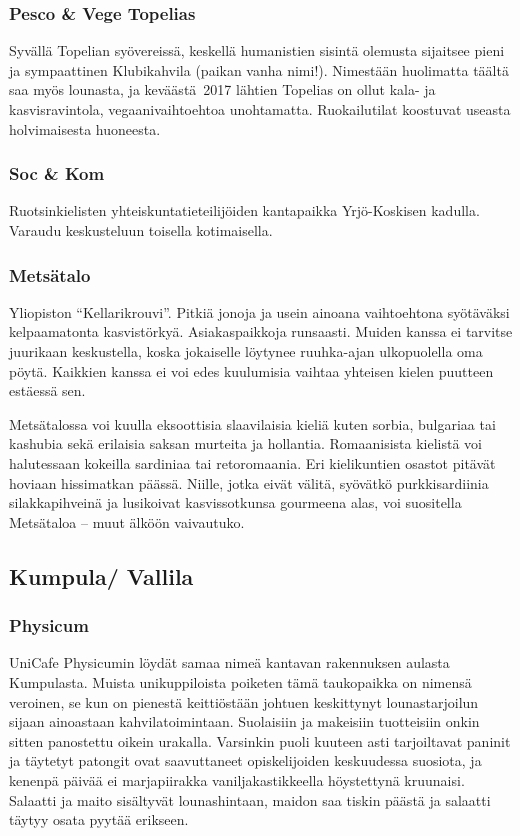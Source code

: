 \documentclass[../ala_hataile.tex]{subfiles}
\begin{document}
\subsubsection*{Pesco \& Vege Topelias}
Syvällä Topelian syövereissä, keskellä
humanistien sisintä olemusta sijaitsee pieni
ja sympaattinen Klubikahvila (paikan vanha
nimi!). Nimestään huolimatta täältä saa
myös lounasta, ja keväästä~2017 lähtien Topelias on ollut kala- ja kasvisravintola, vegaani\-vaihto\-ehtoa unohtamatta. Ruokailutilat
koostuvat useasta holvimaisesta huoneesta.
\subsubsection*{Soc \& Kom}
Ruotsinkielisten yhteiskuntatieteilijöiden
kantapaikka Yrjö-Koskisen kadulla. Varaudu keskusteluun toisella kotimaisella.
\subsubsection*{Metsätalo}
Yliopiston ``Kellarikrouvi''. Pitkiä jonoja
ja usein ainoana vaihtoehtona syötäväksi
kelpaamatonta kasvistörkyä. Asiakaspaikkoja
runsaasti. Muiden kanssa ei tarvitse juurikaan keskustella, koska jokaiselle löytynee
ruuhka-ajan ulkopuolella oma pöytä.
Kaikkien kanssa ei voi edes kuulumisia
vaihtaa yhteisen kielen puutteen estäessä
sen.

Metsätalossa voi kuulla eksoottisia slaavilaisia
kieliä kuten sorbia, bulgariaa tai
kashubia sekä erilaisia saksan murteita ja
hollantia. Romaanisista kielistä voi halutessaan
kokeilla sardiniaa tai retoromaania.
Eri kielikuntien osastot pitävät hoviaan
hissimatkan päässä. Niille, jotka eivät välitä,
syövätkö purkkisardiinia silakkapihveinä
ja lusikoivat kasvissotkunsa gourmeena
alas, voi suositella Metsätaloa -- muut älköön
vaivautuko.
\subsection*{Kumpula/ Vallila}
\subsubsection*{Physicum}
UniCafe Physicumin löydät samaa nimeä
kantavan rakennuksen aulasta Kumpulasta.
Muista unikuppiloista poiketen
tämä taukopaikka on nimensä veroinen, se
kun on pienestä keittiöstään johtuen keskittynyt
lounastarjoilun sijaan ainoastaan
kahvilatoimintaan. Suolaisiin ja makeisiin
tuotteisiin onkin sitten panostettu oikein
urakalla. Varsinkin puoli kuuteen asti tarjoiltavat
paninit ja täytetyt patongit ovat saavuttaneet opiskelijoiden
keskuudessa suosiota, ja kenenpä
päivää ei marjapiirakka vaniljakastikkeella
höystettynä kruunaisi. Salaatti ja maito sisältyvät lounashintaan, maidon saa tiskin päästä ja salaatti täytyy osata pyytää erikseen. 
\end{document}
